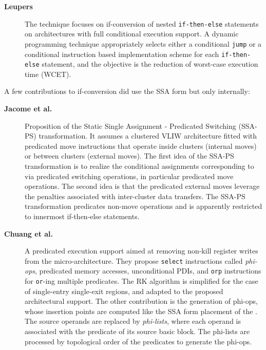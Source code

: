 \begin{description}
\item[\textbf{Leupers~\cite{Leupers:1999:DATE}}] The technique focuses on
if-conversion of nested \texttt{if-then-else} statements on architectures with full
conditional execution support. A dynamic programming technique appropriately
selects either a conditional \texttt{jump} or a conditional instruction based
implementation scheme for each \texttt{if-then-else} statement, and the objective is the
reduction of worst-case execution time (WCET).

\end{description}

A few contributions to if-conversion did use the SSA form
but only internally: \begin{description}

\item[\textbf{Jacome et al.~\cite{Jacome:2001:DAC}}] Proposition of the Static
Single Assignment - Predicated Switching (SSA-PS) transformation. It assumes a
clustered VLIW architecture fitted with predicated move instructions that
operate inside clusters (internal moves) or between clusters (external moves).
The first idea of the SSA-PS transformation is to realize the conditional
assignments corresponding to \phifuns via predicated switching
operations, in particular predicated move operations. The second idea is that
the predicated external moves leverage the penalties associated with
inter-cluster data transfers. The SSA-PS transformation predicates non-move
operations and is apparently restricted to innermost if-then-else statements.

\item[\textbf{Chuang et al.~\cite{Chuang:2003:CGO}}] A predicated execution
support aimed at removing non-kill register writes from the micro-architecture.
They propose \texttt{select} instructions called \emph{phi-ops}, predicated memory
accesses, unconditional PDIs, and \texttt{orp} instructions for \texttt{or}-ing multiple
predicates. The RK algorithm is simplified for the case of single-entry single-exit
regions, and adapted to the proposed architectural support.
The other contribution is the generation of {phi-ops}, whose insertion points
are computed like the SSA form placement of the \phifuns. The
\phifuns source operands are replaced by \emph{phi-lists}, where each
operand is associated with the predicate of its source basic block. The
phi-lists are processed by topological order of the predicates to
generate the {phi-ops}.

\end{description}


